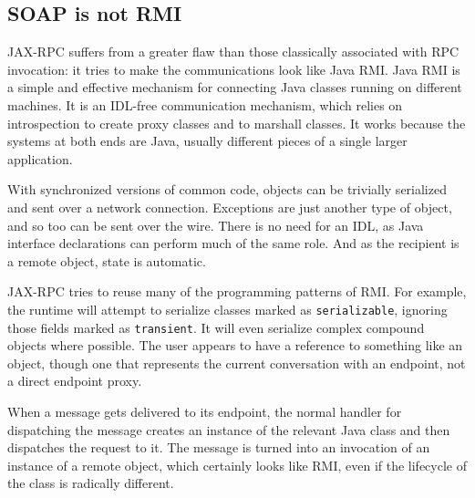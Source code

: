 
\subsection{SOAP is not RMI}
\label{soap-not-rmi}

JAX-RPC suffers from a greater flaw than those classically associated
with RPC invocation: it tries to make the communications look like
Java RMI. Java RMI is a simple and effective mechanism for connecting
Java classes running on different machines. It is an IDL-free
communication mechanism, which relies on introspection to create proxy
classes and to marshall classes. It works because the systems at both
ends are Java, usually different pieces of a single larger
application.

With synchronized versions of common code, objects can be trivially
serialized and sent over a network connection. Exceptions are just
another type of object, and so too can be sent over the wire. There is
no need for an IDL, as Java interface declarations can perform much of
the same role. And as the recipient is a remote object, state is
automatic.

JAX-RPC tries to reuse many of the programming patterns of RMI. For
example, the runtime will attempt to serialize classes marked as
\verb|serializable|, ignoring those fields marked as
\verb|transient|. It will even serialize complex compound objects where
possible. The user appears to have a reference to something like an
object, though one that represents the current conversation with an
endpoint, not a direct endpoint proxy.

When a message gets delivered to its endpoint, the normal handler for
dispatching the message creates an instance of the relevant Java class
and then dispatches the request to it. The message is turned into an
invocation of an instance of a remote object, which certainly looks
like RMI, even if the lifecycle of the class is radically different.


